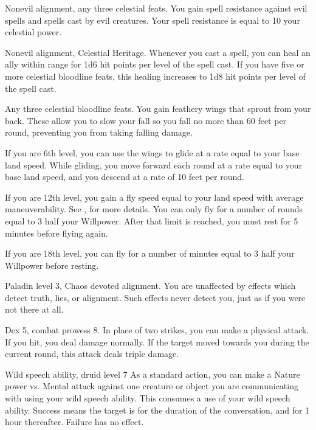 \featpres Nonevil alignment, any three celestial feats.
\featben You gain spell resistance against evil spells and spells cast by evil creatures.
Your spell resistance is equal to 10 \add your celestial power.

\featpres Nonevil alignment, Celestial Heritage.
\featben Whenever you cast a spell, you can heal an ally within \rngclose range for 1d6 hit points per level of the spell cast.
If you have five or more celestial bloodline feats, this healing increases to 1d8 hit points per level of the spell cast.

\featpre Any three celestial bloodline feats.
\featben You gain feathery wings that sprout from your back.
These allow you to slow your fall so you fall no more than 60 feet per round, preventing you from taking falling damage.

If you are 6th level, you can use the wings to glide at a rate equal to your base land speed.
While gliding, you move forward each round at a rate equal to your base land speed, and you descend at a rate of 10 feet per round.

If you are 12th level, you gain a fly speed equal to your land speed with average maneuverability.
See , for more details.
You can only fly for a number of rounds equal to 3 \add half your Willpower.
After that limit is reached, you must rest for 5 minutes before flying again.

If you are 18th level, you can fly for a number of minutes equal to 3 \add half your Willpower before resting.

\featpres Paladin level 3, Chaos devoted alignment.
\featben You are unaffected by effects which detect truth, lies, or alignment.
Such effects never detect you, just as if you were not there at all.

\featpres Dex 5, combat prowess 8.
\featben In place of two strikes, you can make a physical attack.
If you hit, you deal damage normally.
If the target moved towards you during the current round, this attack deals triple damage.

\featpres Wild speech ability, druid level 7
\featben  As a standard action, you can make a Nature power vs. Mental attack against one creature or object you are communicating with using your wild speech ability.
This consumes a use of your wild speech ability.
Success means the target is \charmed for the duration of the conversation, and for 1 hour thereafter.
Failure has no effect.

